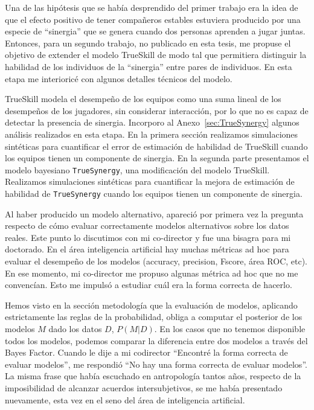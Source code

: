 \documentclass[a4paper,11pt]{book}
\theoremstyle{definition}
\begin{document}
Una de las hip\'otesis que se hab\'ia desprendido del primer trabajo era la idea de que el efecto positivo de tener compa\~neros estables estuviera producido por una especie de ``sinergia'' que se genera cuando dos personas aprenden a jugar juntas.
%
Entonces, para un segundo trabajo, no publicado en esta tesis, me propuse el objetivo de extender el modelo TrueSkill de modo tal que permitiera distinguir la habilidad de los individuos de la ``sinergia'' entre pares de individuos.
%
En esta etapa me interioric\'e con algunos detalles t\'ecnicos del modelo.


TrueSkill modela el desempe\~no de los equipos como una suma lineal de los desempe\~nos de los jugadores, sin considerar interacci\'on, por lo que no es capaz de detectar la presencia de sinergia.
%
Incorporo al Anexo~\ref{sec:TrueSynergy} algunos an\'alisis realizados en esta etapa.
%
En la primera secci\'on realizamos simulaciones sint\'eticas para cuantificar el error de estimaci\'on de habilidad de TrueSkill cuando los equipos tienen un componente de sinergia.
%
En la segunda parte presentamos el modelo bayesiano \texttt{TrueSynergy}, una modificaci\'on del modelo TrueSkill.
%
Realizamos simulaciones sint\'eticas para cuantificar la mejora de estimaci\'on de habilidad de \texttt{TrueSynergy} cuando los equipos tienen un componente de sinergia.


Al haber producido un modelo alternativo, apareci\'o por primera vez la pregunta respecto de c\'omo evaluar correctamente modelos alternativos sobre los datos reales.
%
Este punto lo discutimos con mi co-director y fue una bisagra para mi doctorado.
%
En el \'area inteligencia artificial hay muchas m\'etricas ad hoc para evaluar el desempe\~no de los modelos (accuracy, precision, Fscore, \'area ROC, etc).
%
En ese momento, mi co-director me propuso algunas m\'etrica ad hoc que no me convenc\'ian.
%
Esto me impuls\'o a estudiar cu\'al era la forma correcta de hacerlo.


Hemos visto en la secci\'on metodolog\'ia que la evaluaci\'on de modelos, aplicando estrictamente las reglas de la probabilidad, obliga a computar el posterior de los modelos $M$ dado los datos $D$, $P(M|D)$.
%
En los casos que no tenemos disponible todos los modelos, podemos comparar la diferencia entre dos modelos a trav\'es del Bayes Factor.
%
Cuando le dije a mi codirector ``Encontr\'e la forma correcta de evaluar modelos'', me respondi\'o ``No hay una forma correcta de evaluar modelos''.
%
La misma frase que hab\'ia escuchado en antropolog\'ia tantos a\~nos, respecto de la imposibilidad de alcanzar acuerdos intersubjetivos, se me hab\'ia presentado nuevamente, esta vez en el seno del \'area de inteligencia artificial.
\end{document}
